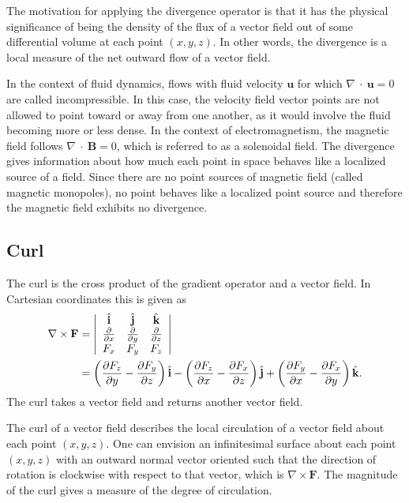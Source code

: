 The motivation for applying the divergence operator is that it has the physical significance of being the density of the flux of a vector field out of some differential volume at each point $(x,y,z)$. In other words, the divergence is a local measure of the net outward flow of a vector field. 

In the context of fluid dynamics, flows with fluid velocity $\mathbf{u}$ for which $\nabla~\cdot~\mathbf{u} = 0$ are called incompressible. In this case, the velocity field vector points are not allowed to point toward or away from one another, as it would involve the fluid becoming more or less dense. In the context of electromagnetism, the magnetic field follows $\nabla~\cdot~\mathbf{B} = 0$, which is referred to as a solenoidal field. The divergence gives information about how much each point in space behaves like a localized source of a field. Since there are no point sources of magnetic field (called magnetic monopoles), no point behaves like a localized point source and therefore the magnetic field exhibits no divergence.

\subsection{Curl}

The curl is the cross product of the gradient operator and a vector field. In Cartesian coordinates this is given as
\begin{align}
  \nabla \times \mathbf{F} &= 
  \left| \begin{array}{c c c}
  \hat{\mathbf{i}} & \hat{\mathbf{j}} & \hat{\mathbf{k}} \\
  \frac{ \partial {} }{ \partial {x} } & \frac{ \partial {} }{ \partial {y} } & \frac{ \partial {} }{ \partial {z} } \\
        F_x &       F_y &       F_z \\ \end{array} \right| \nonumber \\
  &= \left( \frac{ \partial {F_z} }{ \partial {y} } - \frac{ \partial {F_y} }{ \partial {z} } \right) \hat{\mathbf{i}} 
   - \left( \frac{ \partial {F_z} }{ \partial {x} } - \frac{ \partial {F_x} }{ \partial {z} } \right) \hat{\mathbf{j}}
   + \left( \frac{ \partial {F_y} }{ \partial {x} } - \frac{ \partial {F_x} }{ \partial {y} } \right) \hat{\mathbf{k}} .
\end{align}
The curl takes a vector field and returns another vector field.

The curl of a vector field describes the local circulation of a vector field about each point $(x,y,z)$. One can envision an infinitesimal surface about each point $(x,y,z)$ with an outward normal vector oriented such that the direction of rotation is clockwise with respect to that vector, which is $\nabla \times \mathbf{F}$. The magnitude of the curl gives a measure of the degree of circulation.

